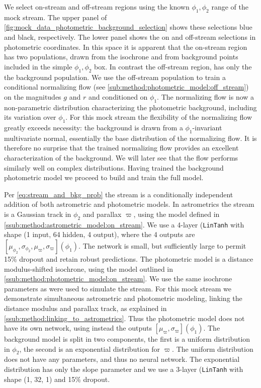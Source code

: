 \documentclass[twocolumn]{aastex631}
\begin{document}
    We select on-stream and off-stream regions using the known $\phi_1, \phi_2$
    range of the mock stream.  The upper panel of
    \autoref{fig:mock_data_photometric_background_selection} shows these
    selections blue and black, respectively.  The lower panel shows the on and
    off-stream selections in photometric coordinates.  In this space it is
    apparent that the on-stream region has two populations, drawn from the
    isochrone and from background points included in the simple $\phi_1, \phi_2$
    box.  In contrast the off-stream region, has only the the background population.
    We use the off-stream population to train a conditional normalizing flow
    (see \autoref{sub:method:photometric_model:off_stream}) on the magnitudes
    $g$ and $r$ and conditioned on $\phi_1$.  The normalizing flow is now a
    non-parametric distribution characterizing the photometric background,
    including its variation over $\phi_1$.  For this mock stream the flexibility
    of the normalizing flow greatly exceeds necessity: the background is
    drawn from a $\phi_1$-invariant multivariate normal, essentially the base
    distribution of the normalizing flow.  It is therefore no surprise that
    the trained normalizing flow provides an excellent characterization of
    the background.  We will later see that the flow performs similarly well
    on complex distributions.  Having trained the background photometric model
    we proceed to build and train the full model.

    Per \autoref{eq:stream_and_bkg_prob} the stream is a conditionally independent
    addition of both astrometric and photometric models.
    In astrometrics the stream is a Gaussian track in $\phi_2$ and
    parallax $\varpi$, using the model defined in
    \autoref{ssub:method:astrometric_model:on_stream}. We use a 4-layer 
    (\texttt{LinTanh} with shape (1 input, 64 hidden, 4 output), where the 4 outputs
    are $[\mu_{\phi_2}, \sigma_{\phi_2}, \mu_{\varpi}, \sigma_{\varpi}](\phi_1)$.
    The network is small, but sufficiently large to permit 15\% dropout and retain
    robust predictions.
    The photometric model is a distance modulus-shifted isochrone, using the model
    outlined in  \autoref{ssub:method:photometric_model:on_stream}. We use the
    same isochrone parameters as were used to simulate the stream. For this mock
    stream we demonstrate simultaneous astrometric and photometric modeling, linking
    the distance modulus and parallax track, as explained in
    \autoref{ssub:method:linking_to_astrometrics}. Thus the photometric model
    does not have its own network, using instead the outputs
    $[\mu_{\varpi}, \sigma_{\varpi}](\phi_1)$.
    The background model is split in two components, the first is a uniform distribution
    in $\phi_2$, the second is an exponential distribution for $\varpi$.
    The uniform distribution does not have any parameters, and thus no neural network.
    The exponential distribution has only the slope parameter and we use a 3-layer 
    (\texttt{LinTanh} with shape (1, 32, 1) and 15\% dropout.
\end{document}
